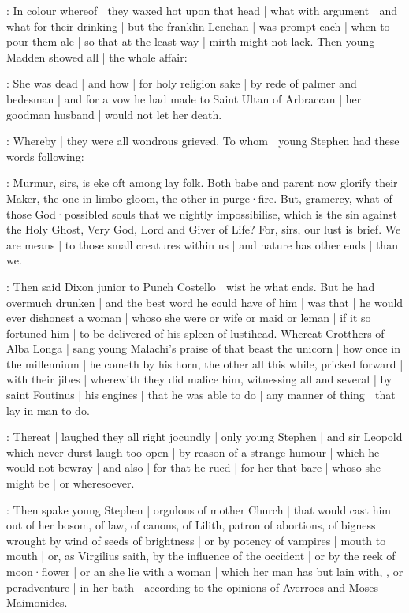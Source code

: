 :
In colour whereof |
they waxed hot upon that head |
what with argument |
and what for their drinking |
but the franklin Lenehan |
was prompt each |
when to pour them ale |
so that at the least way |
mirth might not lack.
Then young Madden showed all |
the whole affair:

\madden:
She was dead |
and how |
for holy religion sake |
by rede of palmer and bedesman |
and for a vow he had made to Saint Ultan of Arbraccan |
her goodman husband |
would not let her death.

:
Whereby |
they were all wondrous grieved.
To whom |
young Stephen had these words following:

\stephen:
Murmur,
sirs,
is eke oft among lay folk.
Both babe and parent now glorify their Maker,
the one in limbo gloom,
the other in purge·fire.
But,
gramercy,
what of those God·possibled souls that we nightly impossibilise,
which is the sin against the Holy Ghost,
Very God,
Lord and Giver of Life?
For,
sirs,
our lust is brief.
We are means |
to those small creatures within us |
and nature has other ends |
than we.

:
Then said Dixon junior to Punch Costello |
wist he what ends.
But he had overmuch drunken |
and the best word he could have of him |
was that |
he would ever dishonest a woman |
whoso she were or wife or maid or leman |
if it so fortuned him |
to be delivered of his spleen of lustihead.
Whereat Crotthers of Alba Longa |
sang young Malachi's praise of that beast the unicorn |
how once in the millennium |
he cometh by his horn,
the other all this while,
pricked forward |
with their jibes |
wherewith they did malice him,
witnessing all and several |
by saint Foutinus |
his engines |
that he was able to do |
any manner of thing |
that lay in man to do.

:
Thereat |
laughed they all right jocundly |
only young Stephen |
and sir Leopold which never durst laugh too open |
by reason of a strange humour |
which he would not bewray |
and also |
for that he rued |
for her that bare |
whoso she might be |
or wheresoever.

:
Then spake young Stephen |
orgulous of mother Church |
that would cast him out of her bosom,
of law,
of canons,
of Lilith,
patron of abortions,
of bigness wrought by wind of seeds of brightness |
or by potency of vampires |
mouth to mouth |
or,
as Virgilius saith,
by the influence of the occident |
or by the reek of moon·flower |
or an she lie with a woman |
which her man has but lain with,
,
or peradventure |
in her bath |
according to the opinions of Averroes and Moses Maimonides.

